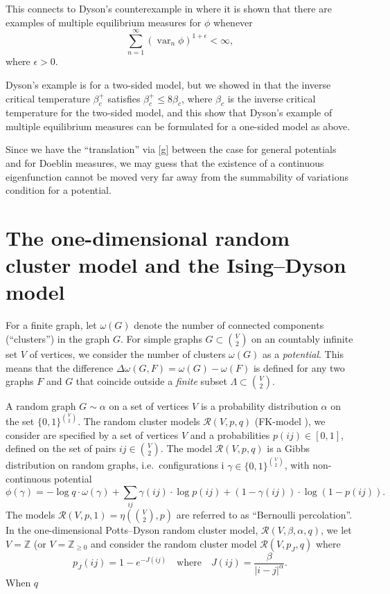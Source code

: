\documentclass[11pt, a4paper]{amsart}
\theoremstyle{definition}
\theoremstyle{remark}
\providecommand{\ZZ}{\mathbb{Z}}
\providecommand{\mscr}{\mathscr}
\providecommand{\opn}{\operatorname}
\providecommand{\var}{\opn{var}}
\providecommand{\w}{\omega}
\begin{document}
This connects to Dyson's counterexample in \cite{dyson} where it is shown that
there are examples of multiple equilibrium measures for $\phi$ whenever
$$\sum_{n=1}^\infty (\var_n \phi)^{1+\epsilon}<\infty,$$
where $\epsilon>0$.

Dyson's example is for a two-sided model, but we showed in \cite{johob4} that
the inverse critical temperature $\beta_c^+$ satisfies $\beta_c^+\leq 8\beta_c$, where $\beta_c$ is
the inverse critical temperature for the two-sided model, and this show that
Dyson's example of multiple equilibrium measures can be formulated for a
one-sided model as above.

Since we have the ``translation'' via \eqref{g} between the case for general
potentials and for Doeblin measures, we may guess that the existence of a
continuous eigenfunction cannot be moved very far away from the summability of
variations condition for a potential.

\section{The one-dimensional random cluster model and the Ising--Dyson model}

For a finite graph, let $\w(G)$ denote the number of connected components
(``clusters'') in the graph $G$. For simple graphs $G\subset \binom V2$ on an
countably infinite set $V$ of vertices, we consider the number of clusters
$\w(G)$ as a \emph{potential}. This means that the difference
$\Delta\w(G,F) = \w(G)-\w(F)$ is defined for any two graphs $F$ and $G$ that
coincide outside a \emph{finite} subset $\Lambda\subset \binom V2$.

A random graph $G\sim\alpha$ on a set of vertices $V$ is a probability
distribution $\alpha$ on the set $\{0,1\}^{\binom V2}$. The random cluster
models $\mscr R(V,p,q)$ (FK-model \cite{grimmet}), we consider are specified by a set 
of vertices $V$ and a probabilities $p(ij)\in[0,1]$, defined on the set of pairs
$ij\in \binom V2$. The model $\mscr R(V,p,q)$ is a Gibbs distribution on random
graphs, i.e.\ configurations i $\gamma\in\{0,1\}^{\binom V2}$, with 
non-continuous potential
$$
\phi(\gamma) = 
- \log q \cdot\w(\gamma) + 
\sum_{ij}\gamma(ij)\cdot \log p(ij) + (1-\gamma(ij))\cdot\log (1-p(ij)).
$$
The models $\mscr R(V,p,1)=\eta(\binom V2,p)$ 
are referred to as ``Bernoulli percolation''. 
In the one-dimensional Potts--Dyson random cluster model, 
$\mscr R(V,\beta,\alpha,q)$,
we let $V=\ZZ$ (or $V=\ZZ_{\ge0}$ and consider the random cluster model 
$\mscr R(V,p_J,q)$ where 
\begin{equation}\label{eq:Jdef}
  p_J(ij) = 1-e^{-J(ij)} \quad\text{where}\quad 
  J({ij}) = \frac \beta{|i-j|^\alpha}.
\end{equation}
When $q$
\end{document}
